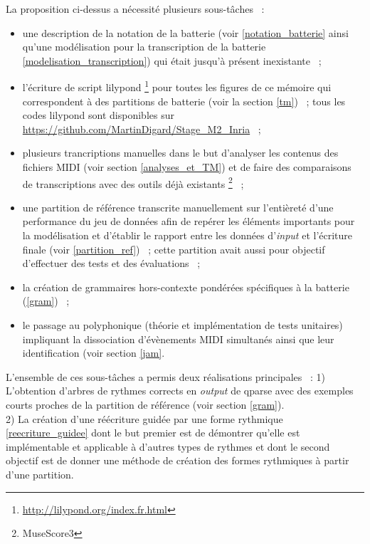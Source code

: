 La proposition ci-dessus a nécessité plusieurs sous-tâches~ :
\begin{itemize}
    \item une description de la notation de la batterie (voir
        \ref{notation_batterie} ainsi qu’une modélisation pour la transcription
        de la batterie \ref{modelisation_transcription}) qui était jusqu’à
        présent inexistante~ ;
    \item l’écriture de script lilypond \footnote{
        \url{http://lilypond.org/index.fr.html}} pour toutes les figures de ce
        mémoire qui correspondent à des partitions de batterie (voir la section
        \ref{tm})~ ; tous les codes lilypond sont disponibles sur \url{
        https://github.com/MartinDigard/Stage_M2_Inria}~ ;
    \item plusieurs trancriptions manuelles dans le but d’analyser les contenus
        des fichiers MIDI (voir section \ref{analyses_et_TM}) et de faire des
        comparaisons de transcriptions avec des outils déjà existants
        \footnote{MuseScore3}~ ;
    \item une partition de référence transcrite manuellement sur l’entièreté
        d’une performance du jeu de données afin de repérer les éléments
        importants pour la modélisation et d’établir le rapport entre les
        données d’\textit{input} et l’écriture finale (voir
        \ref{partition_ref})~ ; cette partition avait aussi pour objectif
        d’effectuer des tests et des évaluations~ ;
    \item  la création de grammaires hors-contexte pondérées spécifiques à
        la batterie (\ref{gram})~ ;
    \item le passage au polyphonique (théorie et implémentation de tests
        unitaires) impliquant la dissociation d’évènements MIDI simultanés
        ainsi que leur identification (voir section \ref{jam}. 
\end{itemize}

L’ensemble de ces sous-tâches a permis deux réalisations principales~ :
1) L’obtention d’arbres de rythmes corrects en \textit{output} de qparse avec
des exemples courts proches de la partition de référence (voir section
\ref{gram}).\\
2) La création d’une réécriture guidée par une forme rythmique
\ref{reecriture_guidee} dont le but premier est de démontrer qu’elle est
implémentable et applicable à d’autres types de rythmes et dont le second
objectif est de donner une méthode de création des formes rythmiques à partir
d’une partition.\\

